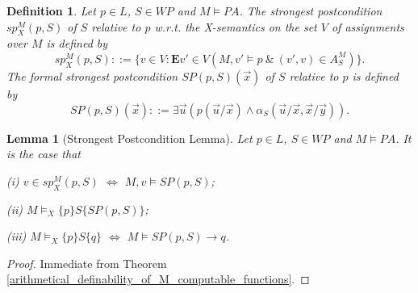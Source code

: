 \documentclass[a4paper,11pt]{article}
\begin{document}
\newtheorem{definition_of_strongest_postconditions}[satisfiability_of_asserted_programs_in_models]{Definition}
\begin{definition_of_strongest_postconditions}\label{definition_of_strongest_postconditions}
Let $p\in L$, $S\in WP$ and $M\models PA$. The strongest postcondition $sp_X^M(p,S)$ of $S$ relative to $p$ w.r.t. the X-semantics on the set $V$ of assignments over $M$ is defined by
\begin{equation*}
 sp_X^M(p,S) ::= \{ v\in V : \textbf{E} v'\in V ( M,v'\models p ~\&~ (v',v)\in A_S^M ) \}.
\end{equation*}
The formal strongest postcondition $SP(p,S)(\vec{x})$ of $S$ relative to $p$ is defined by
\begin{equation*}
  SP(p,S)(\vec{x}) ::= \exists \vec{u} ( p(\vec{u}/\vec{x})\wedge \alpha_S(\vec{u}/\vec{x},\vec{x}/\vec{y}) ).
\end{equation*}
\end{definition_of_strongest_postconditions}


\theoremstyle{plain}
\newtheorem{strongest_postcondition}[satisfiability_of_asserted_programs_in_models]{Lemma}
\begin{strongest_postcondition}[Strongest Postcondition Lemma]\label{strongest_postcondition}
Let $p\in L$, $S\in WP$ and $M\models PA$. It is the case that

(i) $v\in sp_X^M(p,S)$ $\Leftrightarrow$ $M,v\models SP(p,S)$;

(ii) $M\models_X \{p\}S\{SP(p,S)\}$;

(iii) $M\models_X \{p\}S\{q\}$ $\Leftrightarrow$ $M\models SP(p,S)\rightarrow q$.
\end{strongest_postcondition}
\begin{proof}
  Immediate from Theorem \ref{arithmetical_definability_of_M_computable_functions}.
\end{proof}
\end{document}
